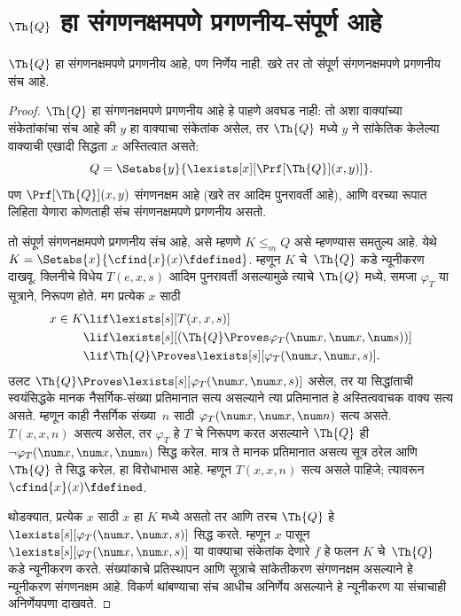\section[Q हा संगणनक्षमपणे प्रगणनीय-संपूर्ण आहे]{$\Th{Q}$ हा संगणनक्षमपणे प्रगणनीय-संपूर्ण आहे}\label{inc:tcp:qce:sec}


\begin{thm}
$\Th{Q}$ हा संगणनक्षमपणे प्रगणनीय आहे, पण निर्णेय नाही.
खरे तर तो संपूर्ण संगणनक्षमपणे प्रगणनीय संच आहे.
\end{thm}

\begin{proof}
$\Th{Q}$ हा संगणनक्षमपणे प्रगणनीय आहे हे पाहणे अवघड नाही:
तो अशा वाक्यांच्या संकेतांकांचा संच आहे की
$y$ हा वाक्याचा संकेतांक असेल, तर $\Th{Q}$ मध्ये
$y$ ने सांकेतिक केलेल्या वाक्याची एखादी सिद्धता $x$ अस्तित्वात असते:
\[Q = \Setabs{y}{\lexists[x][\Prf[\Th{Q}](x,y)]}.
\]
पण $\Prf[\Th{Q}](x,y)$ संगणनक्षम आहे
(खरे तर आदिम पुनरावर्ती आहे), आणि वरच्या रूपात
लिहिता येणारा कोणताही संच संगणनक्षमपणे प्रगणनीय असतो.

तो संपूर्ण संगणनक्षमपणे प्रगणनीय संच आहे, असे म्हणणे
$K \leq_m Q$ असे म्हणण्यास समतुल्य आहे. येथे
$K = \Setabs{x}{\cfind{x}(x) \fdefined}$.
म्हणून $K$ चे~$\Th{Q}$ कडे न्यूनीकरण दाखवू.
क्लिनीचे विधेय $T(e,x,s)$ आदिम पुनरावर्ती असल्यामुळे
त्याचे $\Th{Q}$ मध्ये, समजा $\varphi_T$ या सूत्राने, निरूपण
होते. मग प्रत्येक $x$ साठी
\begin{align*}
x \in K & \lif \lexists[s][T(x,x,s)] \\
& \lif \lexists[s][(\Th{Q} \Proves \varphi_T(\num x,\num x, \num s))]
  \\
& \lif \Th{Q} \Proves \lexists[s][\varphi_T(\num x, \num x, s)].
\end{align*}
उलट $\Th{Q} \Proves \lexists[s][\varphi_T(\num x, \num x, s)]$
असेल, तर या सिद्धांताची स्वयंसिद्धके मानक नैसर्गिक-संख्या
प्रतिमानात सत्य असल्याने त्या प्रतिमानात हे अस्तित्ववाचक
वाक्य सत्य असते. म्हणून काही नैसर्गिक संख्या~$n$ साठी
$\varphi_T(\num x, \num x, \num n)$ सत्य असते.
$T(x,x,n)$ असत्य असेल, तर $\varphi_T$ हे $T$ चे
निरूपण करत असल्याने $\Th{Q}$ ही
$\lnot \varphi_T(\num x, \num x, \num n)$ सिद्ध करेल.
मात्र ते मानक प्रतिमानात असत्य सूत्र ठरेल आणि
$\Th{Q}$ ते सिद्ध करेल, हा विरोधाभास आहे.
म्हणून $T(x,x,n)$ सत्य असले पाहिजे; त्यावरून
$\cfind{x}(x) \fdefined$.

थोडक्यात, प्रत्येक $x$ साठी $x$ हा $K$ मध्ये
असतो तर आणि तरच $\Th{Q}$ हे
$\lexists[s][\varphi_T(\num x,\num x,s)]$ सिद्ध करते.
म्हणून $x$ पासून
$\lexists[s][\varphi_T(\num x,
  \num x, s)]$ या वाक्याचा संकेतांक देणारे
$f$ हे फलन $K$ चे~$\Th{Q}$ कडे न्यूनीकरण करते.
संख्यांकाचे प्रतिस्थापन आणि सूत्राचे सांकेतीकरण
संगणनक्षम असल्याने हे न्यूनीकरण संगणनक्षम आहे.
विकर्ण थांबण्याचा संच आधीच अनिर्णेय असल्याने
हे न्यूनीकरण या संचाचाही अनिर्णेयपणा दाखवते.
\end{proof}












